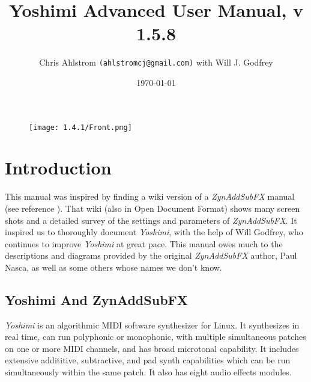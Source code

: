\documentclass[
 11pt,
 twoside,
 a4paper,
 final                                 %
]{article}
\begin{document}
\title{Yoshimi Advanced User Manual, v 1.5.8}
\author{Chris Ahlstrom \texttt{(ahlstromcj@gmail.com)} with Will J. Godfrey}
\date{\today}
\maketitle

\begin{figure}[H]
   \centering 
   \texttt{[image: 1.4.1/Front.png]}
\end{figure}

\clearpage                             %

\tableofcontents
\listoffigures                         %
\listoftables                          %

%

\setlength{\parindent}{2em}
\setlength{\parskip}{1ex plus 0.5ex minus 0.2ex}

\section{Introduction}
\label{sec:introduction}

   This manual was inspired by finding a wiki version of a
   \textsl{ZynAddSubFX} manual (see reference \cite{zynwiki}).  That wiki
   (also in Open Document Format) shows many screen shots and a
   detailed survey of the settings and parameters of \textsl{ZynAddSubFX}.  It
   inspired us to thoroughly document \textsl{Yoshimi}, with the help of
   Will Godfrey, who continues to improve \textsl{Yoshimi} at great pace.
   This manual owes much to the descriptions and diagrams provided by the
   original \textsl{ZynAddSubFX} author, Paul Nasca, as well as some others
   whose names we don't know.

\subsection{Yoshimi And ZynAddSubFX}
\label{subsec:introduction_yoshimi_vs_zyn}

   \textsl{Yoshimi} is an algorithmic MIDI software synthesizer for Linux.
   It synthesizes in real time, can run polyphonic or monophonic, with multiple
   simultaneous patches on one or more MIDI channels, and has broad microtonal
   capability. It includes extensive addititive, subtractive,
   and pad synth capabilities which can be run simultaneously within the
   same patch.  It also has eight audio effects modules.
\end{document}
